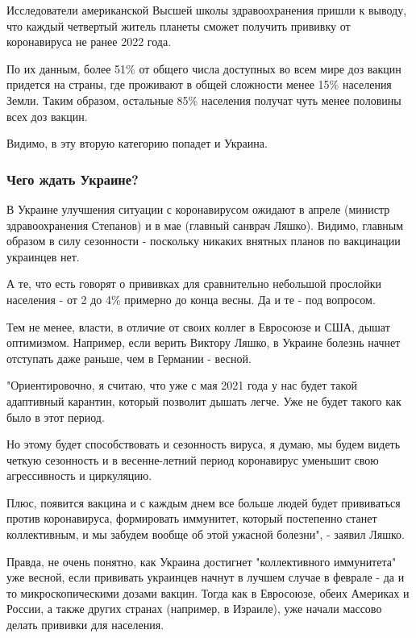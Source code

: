 Исследователи американской Высшей школы здравоохранения пришли к выводу, что
каждый четвертый житель планеты сможет получить прививку от коронавируса не
ранее 2022 года. 

По их данным, более 51\% от общего числа доступных во всем мире доз вакцин
придется на страны, где проживают в общей сложности менее 15\% населения Земли.
Таким образом, остальные 85\% населения получат чуть менее половины всех доз
вакцин.

Видимо, в эту вторую категорию попадет и Украина. 

\subsubsection{Чего ждать Украине?}

В Украине улучшения ситуации с коронавирусом ожидают в апреле (министр
здравоохранения Степанов) и в мае (главный санврач Ляшко). Видимо, главным
образом в силу сезонности - поскольку никаких внятных планов по вакцинации
украинцев нет.

А те, что есть говорят о прививках для сравнительно небольшой прослойки
населения - от 2 до 4\% примерно до конца весны. Да и те - под вопросом. 

Тем не менее, власти, в отличие от своих коллег в Евросоюзе и США, дышат
оптимизмом. Например, если верить Виктору Ляшко, в Украине болезнь начнет
отступать даже раньше, чем в Германии - весной. 

"Ориентировочно, я считаю, что уже с мая 2021 года у нас будет такой адаптивный
карантин, который позволит дышать легче. Уже не будет такого как было в этот
период.

Но этому будет способствовать и сезонность вируса, я думаю, мы будем видеть
четкую сезонность и в весенне-летний период коронавирус уменьшит свою
агрессивность и циркуляцию.

Плюс, появится вакцина и с каждым днем все больше людей будет
прививаться против коронавируса, формировать иммунитет, который постепенно
станет коллективным, и мы забудем вообще об этой ужасной болезни", - заявил
Ляшко.

Правда, не очень понятно, как Украина достигнет "коллективного иммунитета" уже
весной, если прививать украинцев начнут в лучшем случае в феврале - да и то
микроскопическими дозами вакцин. Тогда как в Евросоюзе, обеих Америках и
России, а также других странах (например, в Израиле), уже начали массово делать
прививки для населения.

